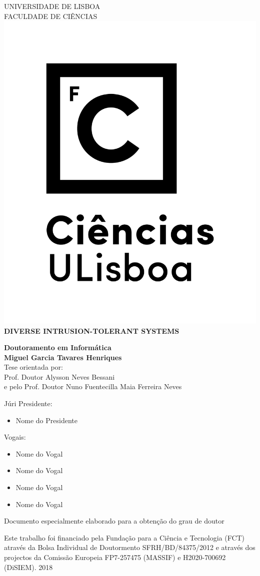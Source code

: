 \documentclass[
 paper=A4,               %
    twoside=true,           %
    openright,              %
    parskip=full,           %
    chapterprefix=true,     %
    11pt,                   %
    headings=normal,        %
    bibliography=totoc,     %
    listof=totoc,           %
    titlepage=on,           %
    captions=tableabove,    %
    draft=false,            %
]{scrreprt}
\theoremstyle{definition}
\newcommand{\TITULO}{DIVERSE INTRUSION-TOLERANT SYSTEMS}
\newcommand{\Autor}{Miguel Garcia Tavares Henriques}
\newcommand{\Orientador}{Alysson Neves Bessani}
\newcommand{\CoOrientador}{Nuno Fuentecilla Maia Ferreira Neves} %
\newcommand{\Ano}{\Large{2018}}
\newcommand{\DOUTORAMENTO}{Doutoramento em Inform\'{a}tica}
\newcommand{\IdiomaTese}{\selectlanguage{english}}
\newcommand{\Especialidade}{}
\newcommand{\Cabecalho}{
\vspace{1cm}\normalfont\normalfont
\vfill
\textsc{\normalsize\uppercase{Universidade de Lisboa}}\\
\normalsize\uppercase{Faculdade de Ci\^{e}ncias}\\
\vspace{1cm}
\includegraphics[scale=.45]{pic/logo_fcul_vertical.png}\\
}
\begin{document}
\begin{center}

\Cabecalho

\vspace{0.5cm}
\vfill
\IdiomaTese
\Large{\textbf{\TITULO}}\\
\vspace{1cm}
\vfill

\large{\textbf{\DOUTORAMENTO}}\\
\vspace{1cm}
\vfill
\Large{\textbf{\Autor}}\\
\vspace{.5 cm}
\vfill
\large{Tese orientada por:}\\
\large{Prof. Doutor \Orientador} \\
e pelo Prof. Doutor \CoOrientador \\
\vspace{.5 cm}
\vfill

\begin{flushleft}  
\large{J\'{u}ri}
\vfill
\setlength{\leftskip}{0.5cm}
\normalsize{Presidente:}
\begin{itemize}
\setlength\itemsep{-0.5 em}
\item{Nome do Presidente}
\end{itemize}
\normalsize{Vogais:}
\begin{itemize}
\setlength\itemsep{-0.5 em}
\item{Nome do Vogal}
\item{Nome do Vogal}
\item{Nome do Vogal}
\item{Nome do Vogal}
\end{itemize}
\setlength{\leftskip}{0cm}
\end{flushleft}
\vspace{0.0cm}
\vfill

\normalsize{Documento especialmente elaborado para a obten\c{c}\~{a}o do grau de doutor\par}
\vspace{0.0cm}
\normalsize{Este trabalho foi financiado pela Funda\c{c}\~{a}o para a Ci\^{e}ncia e Tecnologia (FCT) atrav\'{e}s da Bolsa Individual de Doutormento SFRH/BD/84375/2012 e atrav\'{e}s dos projectos da Comiss\~{a}o Europeia FP7-257475 (MASSIF) e H2020-700692 (DiSIEM).}
\vspace{0.cm}
\vfill
\Ano
\end{center}
\newpage
\mbox{}
\newpage
\end{document}
